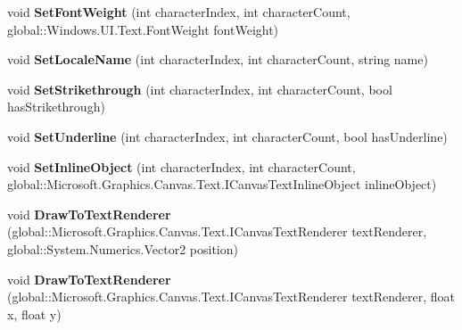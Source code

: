 \begin{DoxyCompactItemize}
void {\bfseries Set\+Font\+Weight} (int character\+Index, int character\+Count, global\+::\+Windows.\+U\+I.\+Text.\+Font\+Weight font\+Weight)
\item 
\mbox{\label{class_microsoft_1_1_graphics_1_1_canvas_1_1_text_1_1_canvas_text_layout_afb6740be2f241b804cd331371d94e024}} 
void {\bfseries Set\+Locale\+Name} (int character\+Index, int character\+Count, string name)
\item 
\mbox{\label{class_microsoft_1_1_graphics_1_1_canvas_1_1_text_1_1_canvas_text_layout_adb3d9f62cfff14e9deb741c9b961e3a0}} 
void {\bfseries Set\+Strikethrough} (int character\+Index, int character\+Count, bool has\+Strikethrough)
\item 
\mbox{\label{class_microsoft_1_1_graphics_1_1_canvas_1_1_text_1_1_canvas_text_layout_a5c9ca1a5dab01179d0a389e3298b1f09}} 
void {\bfseries Set\+Underline} (int character\+Index, int character\+Count, bool has\+Underline)
\item 
\mbox{\label{class_microsoft_1_1_graphics_1_1_canvas_1_1_text_1_1_canvas_text_layout_a4d0d027830a031c0d15c1e89b0f84142}} 
void {\bfseries Set\+Inline\+Object} (int character\+Index, int character\+Count, global\+::\+Microsoft.\+Graphics.\+Canvas.\+Text.\+I\+Canvas\+Text\+Inline\+Object inline\+Object)
\item 
\mbox{\label{class_microsoft_1_1_graphics_1_1_canvas_1_1_text_1_1_canvas_text_layout_adcedc6eac15894cd67db704b047bb206}} 
void {\bfseries Draw\+To\+Text\+Renderer} (global\+::\+Microsoft.\+Graphics.\+Canvas.\+Text.\+I\+Canvas\+Text\+Renderer text\+Renderer, global\+::\+System.\+Numerics.\+Vector2 position)
\item 
\mbox{\label{class_microsoft_1_1_graphics_1_1_canvas_1_1_text_1_1_canvas_text_layout_ae94965b9797ceb30515e3352cba05fdd}} 
void {\bfseries Draw\+To\+Text\+Renderer} (global\+::\+Microsoft.\+Graphics.\+Canvas.\+Text.\+I\+Canvas\+Text\+Renderer text\+Renderer, float x, float y)

\end{DoxyCompactItemize}
